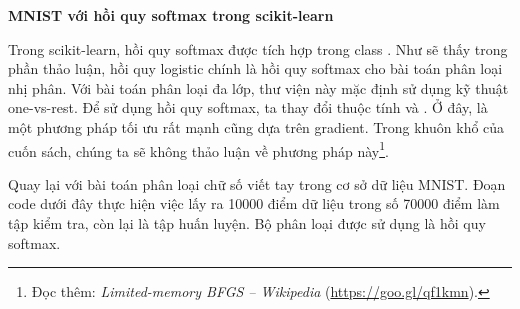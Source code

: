



\newpage
\textbf{MNIST với hồi quy softmax trong scikit-learn}

Trong scikit-learn, hồi quy softmax được tích hợp trong class
. Như sẽ thấy trong phần
thảo luận, hồi quy logistic chính là hồi quy softmax cho bài toán phân loại nhị
phân. Với bài toán phân loại đa lớp, thư viện này mặc định sử dụng kỹ thuật
one-vs-rest. Để sử dụng hồi quy softmax, ta thay đổi thuộc tính
 và .
Ở đây,  là một phương pháp tối ưu rất mạnh cũng dựa trên
gradient. Trong khuôn khổ của cuốn sách, chúng ta sẽ không thảo luận về phương
pháp này\footnote{Đọc thêm: \textit{Limited-memory BFGS -- Wikipedia} (\url{https://goo.gl/qf1kmn}).}.

Quay lại với bài toán phân loại chữ số viết tay trong cơ sở dữ liệu MNIST. Đoạn
code dưới đây thực hiện việc lấy ra 10000 điểm dữ liệu trong số 70000 điểm làm
tập kiểm tra, còn lại là tập huấn luyện. Bộ phân loại được sử dụng là hồi quy softmax.

